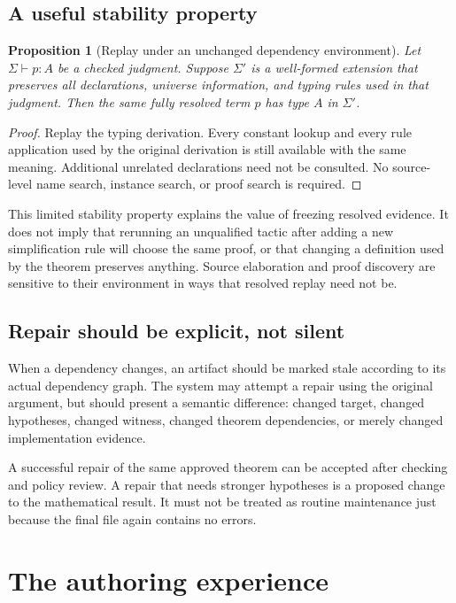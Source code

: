 \documentclass[11pt,letterpaper]{article}
\newtheorem{proposition}{Proposition}[section]
\theoremstyle{remark}
\begin{document}
\subsection{A useful stability property}

\begin{proposition}[Replay under an unchanged dependency environment]
Let $\Sigma\vdash p:A$ be a checked judgment. Suppose $\Sigma'$ is a well-formed extension that preserves all declarations, universe information, and typing rules used in that judgment. Then the same fully resolved term $p$ has type $A$ in $\Sigma'$.
\end{proposition}
\begin{proof}
Replay the typing derivation. Every constant lookup and every rule application used by the original derivation is still available with the same meaning. Additional unrelated declarations need not be consulted. No source-level name search, instance search, or proof search is required.
\end{proof}

This limited stability property explains the value of freezing resolved evidence. It does not imply that rerunning an unqualified tactic after adding a new simplification rule will choose the same proof, or that changing a definition used by the theorem preserves anything. Source elaboration and proof discovery are sensitive to their environment in ways that resolved replay need not be.

\subsection{Repair should be explicit, not silent}

When a dependency changes, an artifact should be marked stale according to its actual dependency graph. The system may attempt a repair using the original argument, but should present a semantic difference: changed target, changed hypotheses, changed witness, changed theorem dependencies, or merely changed implementation evidence.

A successful repair of the same approved theorem can be accepted after checking and policy review. A repair that needs stronger hypotheses is a proposed change to the mathematical result. It must not be treated as routine maintenance just because the final file again contains no errors.

\section{The authoring experience}
\label{sec:ux}
\end{document}
